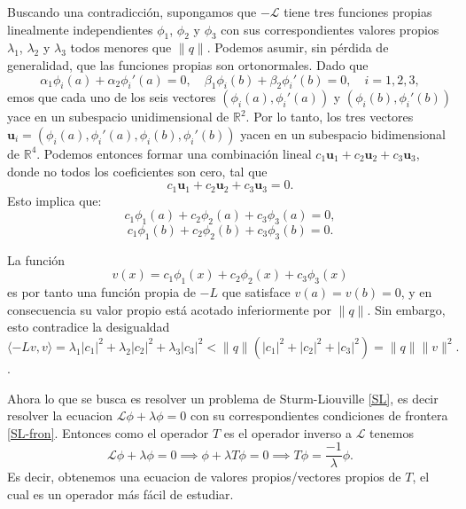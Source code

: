 \documentclass[main.tex]{subfiles}
\begin{document}
Buscando una contradicción, supongamos que $-\mathcal{L}$ tiene tres funciones propias linealmente independientes $\phi_1$, $\phi_2$ y $\phi_3$ con sus correspondientes valores propios $\lambda_1$, $\lambda_2$ y $\lambda_3$ todos menores que $\|q\|$. Podemos asumir, sin pérdida de generalidad, que las funciones propias son ortonormales. Dado que
\[
\alpha_1 \phi_i(a) + \alpha_2 \phi_i'(a) = 0, \quad \beta_1 \phi_i(b) + \beta_2 \phi_i'(b) = 0, \quad i = 1,2,3,
\]
emos que cada uno de los seis vectores $(\phi_i(a), \phi_i'(a))$ y $(\phi_i(b), \phi_i'(b))$ yace en un subespacio unidimensional de $\mathbb{R}^2$. Por lo tanto, los tres vectores $\mathbf{u}_i = (\phi_i(a), \phi_i'(a), \phi_i(b), \phi_i'(b))$ yacen en un subespacio bidimensional de $\mathbb{R}^4$. Podemos entonces formar una combinación lineal $c_1 \mathbf{u}_1 + c_2 \mathbf{u}_2 + c_3 \mathbf{u}_3$, donde no todos los coeficientes son cero, tal que
\[
c_1 \mathbf{u}_1 + c_2 \mathbf{u}_2 + c_3 \mathbf{u}_3 = 0.
\]
Esto implica que:
\[
c_1 \phi_1(a) + c_2 \phi_2(a) + c_3 \phi_3(a) = 0,
\]
\[
c_1 \phi_1(b) + c_2 \phi_2(b) + c_3 \phi_3(b) = 0.
\]

La función
\[
v(x) = c_1 \phi_1(x) + c_2 \phi_2(x) + c_3 \phi_3(x)
\]
es por tanto una función propia de $-L$ que satisface $v(a) = v(b) = 0$, y en consecuencia su valor propio está acotado inferiormente por $\|q\|$. Sin embargo, esto contradice la desigualdad
\[
\langle -L v, v \rangle = \lambda_1 |c_1|^2 + \lambda_2 |c_2|^2 + \lambda_3 |c_3|^2 < \|q\|(|c_1|^2 + |c_2|^2 + |c_3|^2) = \|q\| \|v\|^2.
\]
\QED.

Ahora lo que se busca es resolver un problema de Sturm-Liouville \ref{SL}, es decir resolver la ecuacion $\mathcal{L}\phi+\lambda\phi=0$ con su correspondientes condiciones de frontera \ref{SL-fron}. Entonces como el operador $T$ es el operador inverso a $\mathcal{L}$ tenemos
\[
\mathcal{L}\phi+\lambda\phi=0\implies\phi+\lambda T\phi=0\implies T\phi=\frac{-1}{\lambda}\phi.
\]
Es decir, obtenemos una ecuacion de valores propios/vectores propios de $T$, el cual es un operador más fácil de estudiar.
\end{document}
